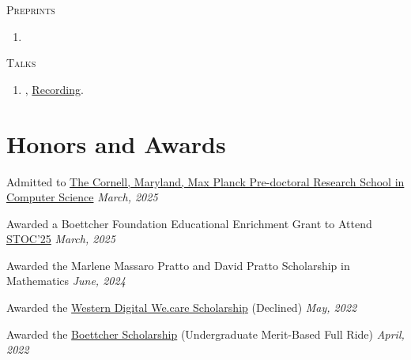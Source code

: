 \documentclass[a4paper,20pt]{article}
\begin{document}
   \textsc{Preprints}
   \begin{enumerate}
    \item {}
  \end{enumerate}
  \textsc{Talks}
  \begin{enumerate}
    \item {}, \href{https://www.youtube.com/watch?v=JWsXMNSOygA}{Recording}.
  \end{enumerate}
  \section{Honors and Awards}
  \begin{description}[font=$\bullet$]
  \item Admitted to \href{https://cmmrs.mpi-sws.org}{The Cornell, Maryland, Max Planck Pre-doctoral Research School in Computer Science} \hfill \textit{March, 2025}
  \vspace{-5pt}
  \item Awarded a Boettcher Foundation Educational Enrichment Grant to Attend \href{https://acm-stoc.org/stoc2025/}{STOC'25} \hfill \textit{March, 2025}
  \vspace{-5pt}
  \item {Awarded the Marlene Massaro Pratto and David Pratto Scholarship in Mathematics \hfill \textit{June, 2024}}
  \vspace{-5pt}
  \item {Awarded the \href{https://scholarshipamerica.org/scholarship/westerndigital-wecare/}{Western Digital We.care Scholarship} (Declined) \hfill \textit{May, 2022}}
  \vspace{-5pt}
  \item {Awarded the \href{https://boettcherfoundation.org}{Boettcher Scholarship} (Undergraduate Merit-Based Full Ride) \hfill \textit{April, 2022}}

\end{description}
\end{document}

